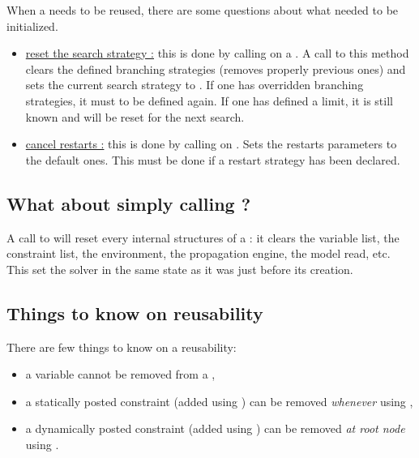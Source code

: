When a  needs to be reused, there are some questions about what needed to be initialized.
\begin{itemize}
\item \underline{reset the search strategy :} this is done by calling  on a .
A call to this method clears the defined branching strategies (removes properly previous ones) and sets the current search strategy to .
If one has overridden branching strategies, it must to be defined again.
If one has defined a limit, it is still known and will be reset for the next search.

\item \underline{cancel restarts :} this is done by calling  on .
Sets the restarts parameters to the default ones. This must be done if a restart strategy has been declared.

\end{itemize}

\subsection{What about simply calling ?}

A call to  will reset every internal structures of a : it clears the variable list, the constraint list, the environment, the propagation engine, the model read, etc.
This set the solver in the same state as it was just before its creation.

\subsection{Things to know on  reusability}

There are few things to know on a  reusability:
\begin{itemize}
\item a variable cannot be removed from a ,
\item a statically posted constraint (added using ) can be removed \textit{whenever} using ,
\item a dynamically posted constraint (added using ) can be removed \textit{at root node} using .
\end{itemize}


